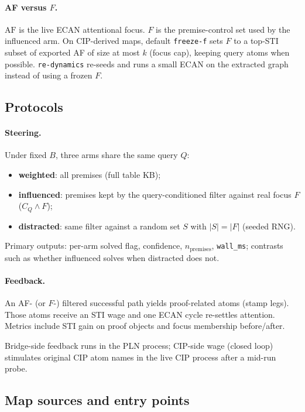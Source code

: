 \documentclass[11pt]{article}
\theoremstyle{definition}
\begin{document}
\paragraph{AF versus $F$.}
$\mathrm{AF}$ is the live ECAN attentional focus. $F$ is the premise-control set used by the influenced arm. On CIP-derived maps, default \texttt{freeze-f} sets $F$ to a top-STI subset of exported AF of size at most $k$ (focus cap), keeping query atoms when possible. \texttt{re-dynamics} re-seeds and runs a small ECAN on the extracted graph instead of using a frozen $F$.

\subsection{Protocols}

\paragraph{Steering.}
Under fixed $B$, three arms share the same query $Q$:
\begin{itemize}
    \item \textbf{weighted}: all premises (full table KB);
    \item \textbf{influenced}: premises kept by the query-conditioned filter against real focus $F$ ($C_Q\wedge F$);
    \item \textbf{distracted}: same filter against a random set $S$ with $|S|=|F|$ (seeded RNG).
\end{itemize}
Primary outputs: per-arm solved flag, confidence, $n_{\mathrm{premises}}$, \texttt{wall\_ms}; contrasts such as whether influenced solves when distracted does not.

\paragraph{Feedback.}
An AF- (or $F$-) filtered successful path yields proof-related atoms (stamp legs). Those atoms receive an STI wage and one ECAN cycle re-settles attention. Metrics include STI gain on proof objects and focus membership before/after. 

Bridge-side feedback runs in the PLN process; CIP-side wage (closed loop) stimulates original CIP atom names in the live CIP process after a mid-run probe.

\subsection{Map sources and entry points}
\end{document}
